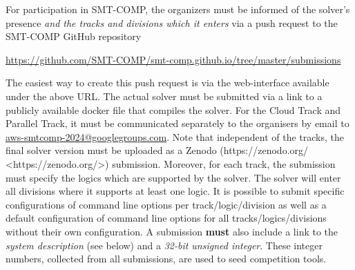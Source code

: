 \documentclass[12pt]{article}
\newcommand{\paralleltrack}{Parallel Track\xspace}
\newcommand{\cloudtrack}{Cloud Track\xspace}
\begin{document}
%
For participation in SMT-COMP, the organizers must be informed of the solver's presence
\emph{and the tracks and divisions which it enters} via a push request
to the SMT-COMP GitHub repository
\begin{center}
  \url{https://github.com/SMT-COMP/smt-comp.github.io/tree/master/submissions}
\end{center}
The easiest way to create this push request is via the web-interface available under
the above URL. The actual solver must be submitted via a link to a publicly available
docker file that compiles the solver. For the \cloudtrack{} and \paralleltrack{},
it must be communicated separately to the organisers by email to
\href{mailto:aws-smtcomp-2024@googlegroups.com}{aws-smtcomp-2024@googlegroups.com}.
Note that independent of the tracks, the final solver version must be uploaded as a Zenodo
(https://zenodo.org/ <https://zenodo.org/>) submission.
Moreover, for each track, the submission must specify the logics which are
supported by the solver. The solver will enter all divisions where it
supports at least one logic. It is possible to submit specific configurations
of command line  options per track/logic/division as well as a default configuration
of command line options for all tracks/logics/divisions without their own configuration.
A submission \textbf{must} also include a link to the \emph{system description} (see below)
and a \emph{32-bit unsigned integer}. These integer numbers, collected from all
submissions, are used to seed competition tools.
\end{document}
